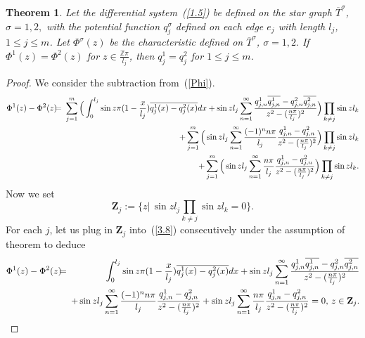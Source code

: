 \documentclass[10pt,a4paper]{article}
\theoremstyle{plain}
\newtheorem{theorem}{Theorem}[section]
\theoremstyle{definition}
\theoremstyle{remark}
\numberwithin{equation}{section}
\begin{document}
\begin{theorem}\label{T3.3}
Let the differential system~(\ref{1.5}) be defined on the star graph 
$\overline{T}^{\sigma}$, $\sigma=1,2,$ with the potential function $q^{\sigma}_{j}$ defined on each  edge $e_{j}$ with length $l_{j}$, $1\leq j\leq m$. Let $\Phi^{\sigma}(z)$ be the characteristic defined on $\overline{T}^{\sigma}$, $\sigma=1,2.$ If $ \Phi^{1}(z)=\Phi^{2}(z)$ for $z\in\frac{\mathbb{Z}\pi}{l_{j}}$, then $q^{1}_{j}=q^{2}_{j}$ for $1\leq j\leq m$.
\end{theorem}
\begin{proof}
We consider the subtraction from~(\ref{Phi}).
\begin{eqnarray}\nonumber
\Phi^{1}(z)-\Phi^{2}(z)&\hspace{-5pt}=\hspace{-5pt}&\sum_{j=1}^{m}\Big(\int_{0}^{l_{j}}\sin{z\pi(1-\frac{x}{l_{j}})}\overline{q^{1}_{j}(x)-q^{2}_{j}(x)}dx+\sin{z l_{j}}\sum_{n=1}^{\infty}\frac{q^{1}_{j,n}\overline{q^{1}_{j,n}}-q^{2}_{j,n}\overline{q^{2}_{j,n}}}{z^{2}-(\frac{n\pi}{l_{j}})^{2}}\Big)\prod_{k\neq j}\sin{z l_{k}}\\&&
+\sum_{j=1}^{m}\Big(\sin{z l_{j}}\sum_{n=1}^{\infty}\frac{(-1)^{n}n\pi}{l_{j}}\frac{q^{1}_{j,n}-q^{2}_{j,n}}{z^{2}-(\frac{n\pi}{l_{j}})^{2}}\Big)\prod_{k\neq j}\sin{z l_{k}}\nonumber\\
&&+\sum_{j=1}^{m}\Big(\sin{zl_{j}}\sum_{n=1}^{\infty}\frac{n\pi}{l_{j}}\frac{q^{1}_{j,n}-q^{2}_{j,n}}{z^{2}-(\frac{n\pi}{l_{j}})^{2}}\Big)\prod_{k\neq j}\sin{z l_{k}}.\label{3.8}
\end{eqnarray}
Now we set%
\begin{equation}
\mathbf{Z}_{j}:=\{z|\,\sin{z l_{j}}\prod_{k\neq j}\sin{z l_{k}}=0\}.
\end{equation}
For each $j$, let us plug in $\mathbf{Z}_{j}$ into~(\ref{3.8}) consecutively under the assumption of theorem  to deduce
\begin{eqnarray}\nonumber
\Phi^{1}(z)-\Phi^{2}(z)&\hspace{-5pt}=\hspace{-5pt}&\int_{0}^{l_{j}}\sin{z\pi(1-\frac{x}{l_{j}})}\overline{q^{1}_{j}(x)-q^{2}_{j}(x)}dx+\sin{z l_{j}}\sum_{n=1}^{\infty}\frac{q^{1}_{j,n}\overline{q^{1}_{j,n}}-q^{2}_{j,n}\overline{q^{2}_{j,n}}}{z^{2}-(\frac{n\pi}{l_{j}})^{2}}\\&&
+\sin{z l_{j}}\sum_{n=1}^{\infty}\frac{(-1)^{n}n\pi}{l_{j}}\frac{q^{1}_{j,n}-q^{2}_{j,n}}{z^{2}-(\frac{n\pi}{l_{j}})^{2}}+\sin{zl_{j}}\sum_{n=1}^{\infty}\frac{n\pi}{l_{j}}\frac{q^{1}_{j,n}-q^{2}_{j,n}}{z^{2}-(\frac{n\pi}{l_{j}})^{2}}=0,\,z\in\mathbf{Z}_{j}.

\end{eqnarray}
\end{proof}
\end{document}
